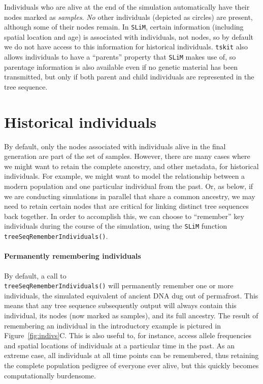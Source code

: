 \documentclass[12pt]{article}
\newcommand{\tskit}[0]{\texttt{tskit}\xspace}
\newcommand{\slim}[0]{\texttt{SLiM}\xspace}
\begin{document}
Individuals who are alive at the end of the simulation automatically have their nodes marked as \textit{samples}.
\emph{No} other individuals (depicted as circles) are present,
although some of their nodes remain.
In \slim, certain information (including spatial location and age) is associated with individuals,
not nodes, so by default we do not have access to this information for historical individuals.
\tskit also allows individuals to have a ``parents'' property that \slim makes use of,
so parentage information is also available even if no genetic material has been transmitted,
but only if both parent and child individuals are represented in the tree sequence.

\section*{Historical individuals}
By default, only the nodes associated with individuals alive in the final generation are part of the set of samples.
However, there are many cases where we might want to retain the complete ancestry, and other metadata, for
historical individuals.
For example, we might want to model the relationship between a modern population and
one particular individual from the past.
Or, as below, if we are conducting simulations in parallel that share 
a common ancestry, we may need to retain certain nodes that are critical for linking distinct
tree sequences back together.
In order to accomplish this, we can choose to ``remember'' key individuals during the course of the simulation,
using the \slim function \verb|treeSeqRememberIndividuals()|.

\paragraph{Permanently remembering individuals}
By default, a call to \\ 
\verb|treeSeqRememberIndividuals()| will permanently remember one or more individuals,
the simulated equivalent of ancient DNA dug out of permafrost.
This means that any tree sequence subsequently output will always contain this individual,
its nodes (now marked as samples), and its full ancestry.
The result of remembering an individual in the introductory example is pictured
in Figure~\ref{fig:indivs}C.
This is also useful to, for instance, access allele frequencies and spatial locations of individuals
at a particular time in the past.
As an extreme case, all individuals at all time points can be remembered,
thus retaining the complete population pedigree of everyone ever alive,
but this quickly becomes computationally burdensome.
\end{document}
